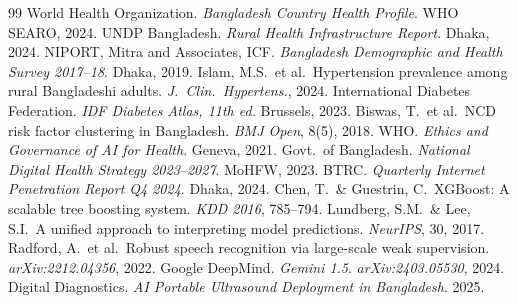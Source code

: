 \documentclass[12pt, a4paper]{article}
\begin{document}
\begin{thebibliography}{99}
\small
{} World Health Organization. \textit{Bangladesh Country Health Profile}. WHO SEARO, 2024.
 UNDP Bangladesh. \textit{Rural Health Infrastructure Report}. Dhaka, 2024.
 NIPORT, Mitra and Associates, ICF. \textit{Bangladesh Demographic and Health Survey 2017--18}. Dhaka, 2019.
 Islam, M.S.\ et al.\ Hypertension prevalence among rural Bangladeshi adults. \textit{J.\ Clin.\ Hypertens.}, 2024.
 International Diabetes Federation. \textit{IDF Diabetes Atlas, 11th ed.} Brussels, 2023.
 Biswas, T.\ et al.\ NCD risk factor clustering in Bangladesh. \textit{BMJ Open}, 8(5), 2018.
 WHO. \textit{Ethics and Governance of AI for Health}. Geneva, 2021.
 Govt.\ of Bangladesh. \textit{National Digital Health Strategy 2023--2027}. MoHFW, 2023.
 BTRC. \textit{Quarterly Internet Penetration Report Q4 2024}. Dhaka, 2024.
 Chen, T.\ \& Guestrin, C.\ XGBoost: A scalable tree boosting system. \textit{KDD 2016}, 785--794.
 Lundberg, S.M.\ \& Lee, S.I.\ A unified approach to interpreting model predictions. \textit{NeurIPS}, 30, 2017.
 Radford, A.\ et al.\ Robust speech recognition via large-scale weak supervision. \textit{arXiv:2212.04356}, 2022.
 Google DeepMind. \textit{Gemini 1.5}. \textit{arXiv:2403.05530}, 2024.
 Digital Diagnostics. \textit{AI Portable Ultrasound Deployment in Bangladesh}. 2025.
\end{thebibliography}
\end{document}
